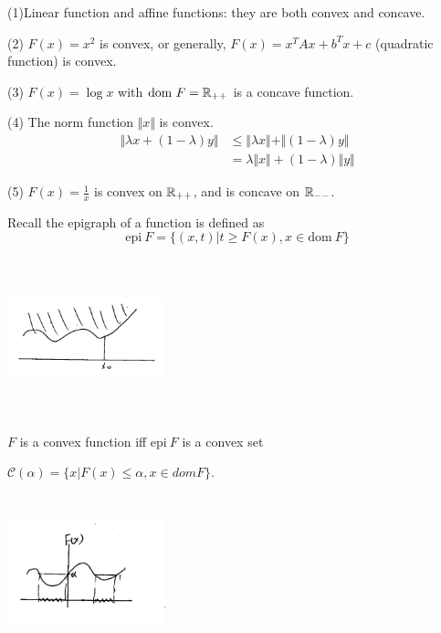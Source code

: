 	(1)Linear function and affine functions: they are both convex and concave.
	
	(2) $F(x)=x^2$ is convex, or generally, $F(x) = x^TAx + b^Tx + c$ (quadratic function) is convex.
	
	(3) $F(x) = \log x$ with $\text{dom}\ F = \mathbb{R}_{++}$ is a concave function.
	
	(4) The norm function $\Vert x\Vert$ is convex.
	\begin{align*}
	\Vert \lambda x + (1-\lambda)y\Vert &\leq \Vert \lambda x\Vert + \Vert(1-\lambda)y\Vert\\
	&= \lambda \Vert x \Vert + (1-\lambda)\Vert y \Vert
	\end{align*}
	
	(5) $F(x)=\frac{1}{x}$ is convex on $\mathbb{R}_{++}$, and is concave on $\mathbb{R}_{--}$.
	
	
	
\vspace{0.5cm}
\begin{definition}[Epigraph]
Recall the epigraph of a function is defined as
\begin{equation*}
\text{epi}\ F = \{(x,t)|t\geq F(x), x\in \text{dom}\ F \}
\end{equation*}
\end{definition}

\begin{marginfigure}
	\centering
	\includegraphics[width=1.8in,height=1.8in]{figures/ch08/figure1030_11.png}
\end{marginfigure}

\begin{definition}
	$F$ is a convex function iff $\text{epi}\ F$ is a convex set
\end{definition}

\begin{definition}
	$\mathcal{C}(\alpha) = \{x|F(x)\leq \alpha, x\in domF \}$.
	
	\begin{marginfigure}
	\centering
	\includegraphics[width=1.8in,height=1.8in]{figures/ch08/figure1030_12.png}
	\end{marginfigure}
\end{definition}

